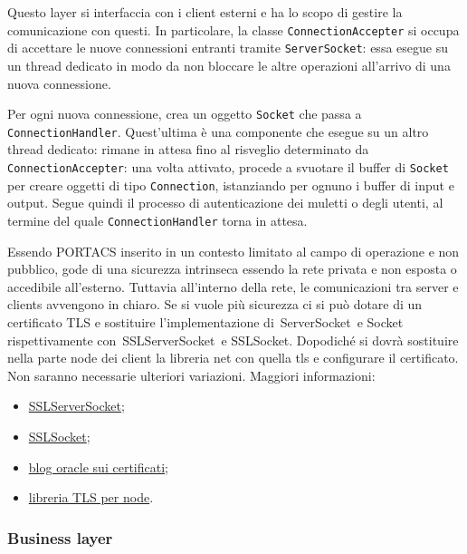 Questo layer si interfaccia con i client esterni e ha lo scopo di gestire la comunicazione con questi. In particolare, la classe \texttt{ConnectionAccepter} si occupa di accettare le nuove connessioni entranti tramite \texttt{ServerSocket}: essa esegue su un thread dedicato in modo da non bloccare le altre operazioni all'arrivo di una nuova connessione.

Per ogni nuova connessione, crea un oggetto \texttt{Socket} che passa a \texttt{ConnectionHandler}. Quest'ultima è una componente che esegue su un altro thread dedicato: rimane in attesa fino al risveglio determinato da \texttt{ConnectionAccepter}: una volta attivato, procede a svuotare il buffer di \texttt{Socket} per creare oggetti di tipo \texttt{Connection}, istanziando per ognuno i buffer di input e output. Segue quindi il processo di autenticazione dei muletti o degli utenti, al termine del quale \texttt{ConnectionHandler} torna in attesa.

    Essendo PORTACS inserito in un contesto limitato al campo di operazione e non pubblico, gode di una sicurezza intrinseca essendo la rete privata e non esposta o accedibile all'esterno. Tuttavia all'interno della rete, le comunicazioni tra server e clients avvengono in chiaro. Se si vuole più sicurezza ci si può dotare di un certificato TLS e sostituire l'implementazione di ServerSocket e Socket rispettivamente con SSLServerSocket e SSLSocket. Dopodiché si dovrà sostituire nella parte node dei client la libreria net con quella tls e configurare il certificato. Non saranno necessarie ulteriori variazioni. Maggiori informazioni:
    \begin{itemize}
        \item \href{https://docs.oracle.com/en/java/javase/15/docs/api/java.base/javax/net/ssl/SSLServerSocket.html}{SSLServerSocket};
        \item \href{https://docs.oracle.com/en/java/javase/15/docs/api/java.base/javax/net/ssl/SSLSocket.html}{SSLSocket};
        \item \href{https://blogs.oracle.com/blogbypuneeth/steps-to-create-a-self-signed-certificate-using-openssl}{blog oracle sui certificati};
        \item \href{https://nodejs.org/api/tls.html}{libreria TLS per node}.
    \end{itemize}





\clearpage
\subsubsection{Business layer}

